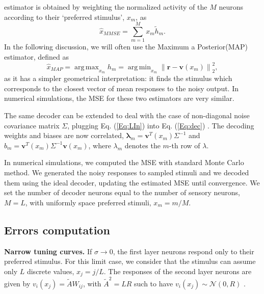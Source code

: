 \documentclass[a4paper]{article}%
\DeclareMathOperator*{\argmin}{arg\,min}
\DeclareMathOperator*{\argmax}{arg\,max}
\begin{document}
estimator is obtained by weighting the normalized activity of the $M$ neurons
according to their `preferred stimulus', $x_{m}$, as
\begin{equation}
\hat{x}_{MMSE} = \sum_{m=1}^{M} x_{m} \tilde{h}_{m}. \label{Eq:Dec}%
\end{equation}
In the following discussion, we will often use the Maximum a Posterior(MAP)
estimator, defined as
\begin{equation}
\hat{x}_{MAP} = \argmax_{x_{m}} h_{m} = \argmin_{x_{m}} \left\|  \mathbf{r} -
\mathbf{v} (x_{m})\right\|  _{2}^{2}, \label{Eq:ML}%
\end{equation}
as it has a simpler geometrical interpretation: it finds the stimulus which
corresponds to the closest vector of mean responses to the noisy output. In
numerical simulations, the MSE for these two estimators are very similar.

The same decoder can be extended to deal with the case of non-diagonal noise
covariance matrix $\Sigma$, plugging Eq. (\ref{Eq:LIn}) into Eq.
(\ref{Eq:dec}) . The decoding weights and biases are now correlated,
$\mathbf{\lambda}_{m} = \mathbf{v}^{T}(x_{m} )\Sigma^{-1}$ and $b_{m} =
\mathbf{v}^{T}(x_{m})\Sigma^{-1}\mathbf{v}(x_{m})$, where $\lambda_{m}$
denotes the $m$-th row of $\lambda$.

In numerical simulations, we computed the MSE with standard Monte Carlo
method. We generated the noisy responses to sampled stimuli and we decoded
them using the ideal decoder, updating the estimated MSE until convergence. We
set the number of decoder neurons equal to the number of sensory neurons,
$M=L$, with uniformly space preferred stimuli, $x_{m} = m/M$.
\newline

\subsection*{Errors computation}

\textbf{Narrow tuning curves.} If $\sigma\rightarrow0$, the first layer
neurons respond only to their preferred stimulus. For this limit case, we
consider that the stimulus can assume only $L$ discrete values, $x_{j} = j/L$.
The responses of the second layer neurons are given by $v_{i}(x_{j}) =
\tilde{A}W_{ij}$, with $\tilde{A}^{2} = L R$ such to have $v_{i}(x_{j})
\sim\mathcal{N}(0,R)$ .
\end{document}
